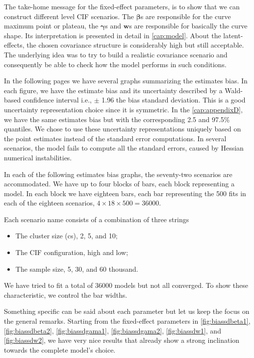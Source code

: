 The take-home message for the fixed-effect parameters, is to show that
we can construct different level CIF scenarios. The \(\bm{\beta}\)s are
responsible for the curve maximum point or plateau, the \(\bm{\gamma}\)s
and \(\bm{w}\)s are responsible for basically the curve shape. Its
interpretation is presented in detail in \autoref{cap:model}. About the
latent-effects, the chosen covariance structure is considerably high but
still acceptable. The underlying idea was to try to build a realistic
covariance scenario and consequently be able to check how the model
performs in such conditions.

In the following pages we have several graphs summarizing the estimates
bias. In each figure, we have the estimate bias and its uncertainty
described by a Wald-based confidence interval i.e., \(\pm\) 1.96 the
bias standard deviation. This is a good uncertainty representation
choice since it is symmetric. In the \autoref{cap:appendixD}, we have
the same estimates bias but with the corresponding 2.5 and 97.5\%
quantiles. We chose to use these uncertainty representations uniquely
based on the point estimates instead of the standard error
computations. In several scenarios, the model fails to compute all the
standard errors, caused by Hessian numerical instabilities.

In each of the following estimates bias graphs, the seventy-two
scenarios are accommodated. We have up to four blocks of bars, each
block representing a model. In each block we have eighteen bars, each
bar representing the 500 fits in each of the eighteen
scenarios, \(4 \times 18 \times 500 = 36000\).

Each scenario name consists of a combination of three strings
\begin{itemize}
 \item The cluster size (cs), 2, 5, and 10;
 \item The CIF configuration, high and low;
 \item The sample size, 5, 30, and 60 thousand.
\end{itemize}
We have tried to fit a total of 36000 models but not all converged. To
show these characteristic, we control the bar widths.

Something specific can be said about each parameter but let us keep the
focus on the general remarks. Starting from the fixed-effect parameters
in \autoref{fig:biassdbeta1}, \autoref{fig:biassdbeta2},
\autoref{fig:biassdgama1}, \autoref{fig:biassdgama2},
\autoref{fig:biassdw1}, and \autoref{fig:biassdw2}, we have very nice
results that already show a strong inclination towards the complete
model's choice.


